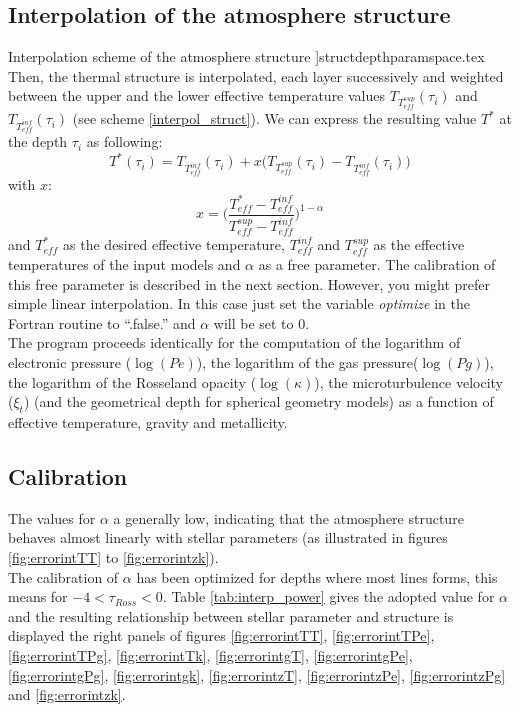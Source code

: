\documentclass[11pt]{article}
\begin{document}
\subsection{Interpolation of the atmosphere structure}
{Interpolation scheme of the atmosphere structure}\label{interpol_struct}
]{structdepthparamspace.tex} 
Then, the thermal structure is interpolated, each layer successively and weighted between the upper and the lower effective temperature values $T_{T_{eff}^{sup}}(\tau_i)$ and $T_{T_{eff}^{inf}}(\tau_i)$ (see scheme \ref{interpol_struct}). We can express the resulting value $T^*$ at the depth $\tau_i$ as following:
\begin{displaymath}\label{interpformula}
T^*(\tau_i) = T_{T_{eff}^{inf}}(\tau_i) + x \big(T_{T_{eff}^{sup}}(\tau_i)-T_{T_{eff}^{inf}}(\tau_i)\big)
\end{displaymath}
with $x$:
\begin{displaymath}
x = \bigg(\frac{T_{eff}^*-T_{eff}^{inf}}{T_{eff}^{sup}-T_{eff}^{inf}}\bigg)^{1-\alpha}
\end{displaymath}
and $T_{eff}^*$ as the desired effective temperature, $T_{eff}^{inf}$ 
and $T_{eff}^{sup}$ as the effective temperatures of the input models and $\alpha$ as a free parameter. The calibration of this free parameter is described in the next section. However, you might prefer simple linear interpolation. In this case just set the variable \textit{optimize} in the Fortran routine to ``.false.'' and $\alpha$ will be set to 0. \\
The program proceeds identically for the computation of the logarithm of electronic pressure ($\log(Pe)$), the logarithm of the gas pressure($\log (Pg)$), the logarithm of the Rosseland opacity ($\log (\kappa)$), the microturbulence velocity ($\xi_t$) (and the geometrical depth  for spherical geometry models) as a function of effective temperature, gravity and metallicity.\\

\subsection{Calibration}
The values for $\alpha$ a generally low, indicating that the atmosphere structure behaves almost linearly with stellar parameters (as illustrated in figures \ref{fig:errorintTT} to \ref{fig:errorintzk}).\\
The calibration of $\alpha$ has been optimized for depths where most lines forms, this means for $-4 < \tau_{Ross} < 0$. Table \ref{tab:interp_power} gives the adopted value for $\alpha$ and the resulting relationship between stellar parameter and structure is displayed the right panels of figures \ref{fig:errorintTT}, \ref{fig:errorintTPe}, \ref{fig:errorintTPg}, \ref{fig:errorintTk}, \ref{fig:errorintgT}, \ref{fig:errorintgPe}, \ref{fig:errorintgPg}, \ref{fig:errorintgk}, \ref{fig:errorintzT}, \ref{fig:errorintzPe}, \ref{fig:errorintzPg} and \ref{fig:errorintzk}.
\end{document}
